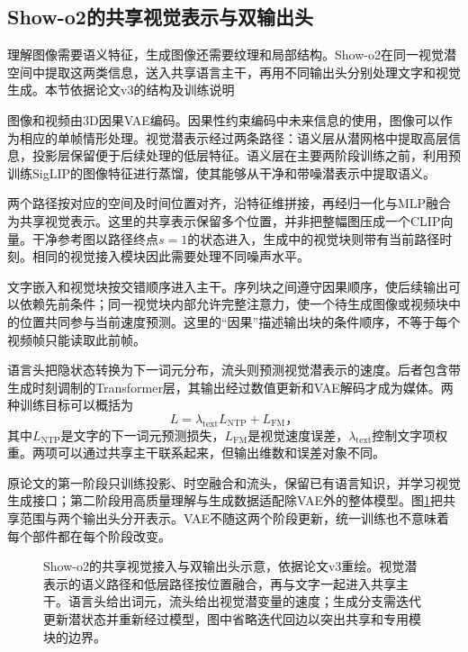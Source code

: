 \subsection{Show-o2的共享视觉表示与双输出头}
\label{sec:vision-models-showo2}

理解图像需要语义特征，生成图像还需要纹理和局部结构。Show-o2在同一视觉潜空间中提取这两类信息，送入共享语言主干，再用不同输出头分别处理文字和视觉生成。本节依据论文v3的结构及训练说明

图像和视频由3D因果VAE编码。因果性约束编码中未来信息的使用，图像可以作为相应的单帧情形处理。视觉潜表示经过两条路径：语义层从潜网格中提取高层信息，投影层保留便于后续处理的低层特征。语义层在主要两阶段训练之前，利用预训练SigLIP的图像特征进行蒸馏，使其能够从干净和带噪潜表示中提取语义。

两个路径按对应的空间及时间位置对齐，沿特征维拼接，再经归一化与MLP融合为共享视觉表示。这里的共享表示保留多个位置，并非把整幅图压成一个CLIP向量。干净参考图以路径终点$s=1$的状态进入，生成中的视觉块则带有当前路径时刻。相同的视觉接入模块因此需要处理不同噪声水平。

文字嵌入和视觉块按交错顺序进入主干。序列块之间遵守因果顺序，使后续输出可以依赖先前条件；同一视觉块内部允许完整注意力，使一个待生成图像或视频块中的位置共同参与当前速度预测。这里的“因果”描述输出块的条件顺序，不等于每个视频帧只能读取此前帧。

语言头把隐状态转换为下一词元分布，流头则预测视觉潜表示的速度。后者包含带生成时刻调制的Transformer层，其输出经过数值更新和VAE解码才成为媒体。两种训练目标可以概括为
\begin{equation}
  L=\lambda_{\mathrm{text}}L_{\mathrm{NTP}}+L_{\mathrm{FM}}\text{，}
  \label{eq:vision-showo-loss}
\end{equation}
其中$L_{\mathrm{NTP}}$是文字的下一词元预测损失，$L_{\mathrm{FM}}$是视觉速度误差，$\lambda_{\mathrm{text}}$控制文字项权重。两项可以通过共享主干联系起来，但输出维数和误差对象不同。

原论文的第一阶段只训练投影、时空融合和流头，保留已有语言知识，并学习视觉生成接口；第二阶段用高质量理解与生成数据适配除VAE外的整体模型。图\ref{fig:vision-showo-heads}把共享范围与两个输出头分开表示。VAE不随这两个阶段更新，统一训练也不意味着每个部件都在每个阶段改变。

\begin{figure}[htbp]
  \centering
  
  \caption{Show-o2的共享视觉接入与双输出头示意，依据论文v3重绘。视觉潜表示的语义路径和低层路径按位置融合，再与文字一起进入共享主干。语言头给出词元，流头给出视觉潜变量的速度；生成分支需迭代更新潜状态并重新经过模型，图中省略迭代回边以突出共享和专用模块的边界。}
  \label{fig:vision-showo-heads}
\end{figure}
\FloatBarrier

